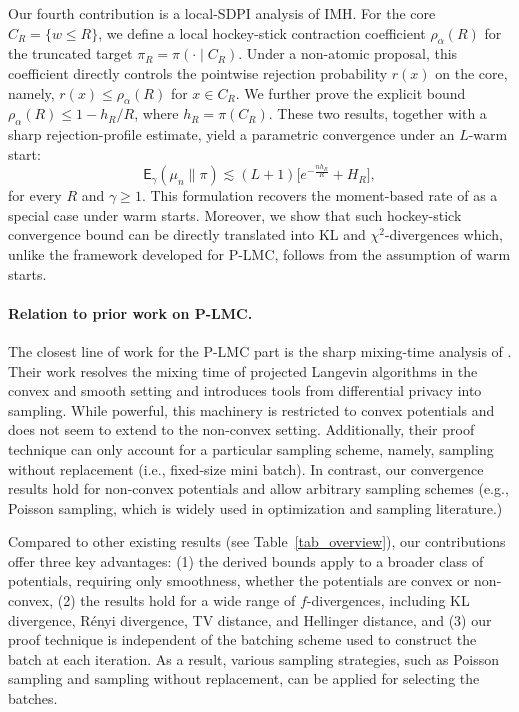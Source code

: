 \documentclass[10pt, journal]{IEEEtran}
\begin{document}
Our fourth contribution is a local-SDPI analysis of IMH. For the core $C_R=\{w\le R\}$, we define a local hockey-stick contraction coefficient $\rho_\alpha(R)$ for the truncated target $\pi_R=\pi(\cdot\mid C_R)$. Under a non-atomic proposal, this coefficient directly controls the pointwise rejection probability $r(x)$ on the core, namely,  $r(x)\le \rho_\alpha(R)$ for $x\in C_R$. We further prove the explicit bound $\rho_\alpha(R)\le 1-h_R/R$, where $h_R=\pi(C_R)$. These two results, together with a sharp rejection-profile estimate, yield a parametric convergence under an $L$-warm start:
$$\mathsf E_\gamma(\mu_n\|\pi)\lesssim (L+1)\Big[e^{-\frac{nh_R}{R}}+H_R\Big],$$
for every $R$ and $\gamma\geq 1$. 
This formulation recovers the moment-based rate of \cite{deligiannidis2024importance} as a special case under warm starts.  Moreover, we show that such hockey-stick convergence bound  can be directly translated into KL and $\chi^2$-divergences which, unlike the framework developed for P-LMC, follows from the assumption of warm starts. 

\paragraph{Relation to prior work on P-LMC.}
The closest line of work for the P-LMC part is the sharp mixing-time analysis of \cite{altschuler2022resolving}. Their work resolves the mixing time of projected Langevin algorithms in the convex and smooth setting and introduces tools from differential privacy into sampling.  
While powerful, this machinery is restricted to convex potentials and does not seem to extend to the non-convex setting. Additionally, their proof technique can only account for a particular sampling scheme, namely, sampling without replacement (i.e., fixed-size mini batch). In contrast, our convergence results hold for non-convex potentials and allow  arbitrary sampling schemes (e.g., Poisson sampling, which is widely used in optimization and sampling literature.) 

Compared to other existing results (see Table~\ref{tab_overview}), our contributions offer three key advantages: (1) the derived bounds apply to a broader class of potentials, requiring only smoothness, whether the potentials are convex or non-convex, (2) the results hold for a wide range of $f$-divergences, including KL divergence, R\'enyi divergence, TV distance, and Hellinger distance, and (3) our proof technique is independent of the batching scheme used to construct the batch at each iteration. As a result, various sampling strategies, such as Poisson sampling and sampling without replacement, can be applied for selecting the batches.
\end{document}
